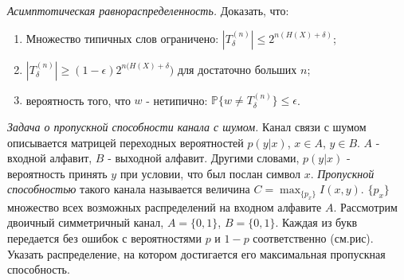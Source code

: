 \begin{problem} \textit{Асимптотическая равнораспределенность.}
Доказать, что:
\begin{enumerate}
\item Множество типичных слов ограничено: $|T_{\delta}^{(n)}| \leq 2^{n(H(X) + \delta)}$;
\item $|T_{\delta}^{(n)}| \geq (1-\epsilon)2^{n(H(X) + \delta})$ для достаточно больших $n$;
\item вероятность того, что $w$ - нетипично: $\mathbb{P}\{w \neq T_{\delta}^{(n)} \} \leq \epsilon$.
\end{enumerate}
\end{problem}
\begin{comment}
\begin{remark} Идея о типичных последовательностях лежит в основе кодирования. Например, $\delta$-типичные $n$-буквенные слова кодируются при помощи двоичных последовательностей длины $n(H(X) + \delta)$, нетипичные отбрасываются или представляются одним и тем же добавочным символом. Очевидно, что при декодировании (восстановлении) вероятность ошибки не превысит $\epsilon$.
\end{remark}

\begin{problem} Рассмотрите связь между доказательством принципа асимптотической равнораспределенности и эквивалентностью (для больших систем)энтропий Больцмана и Гиббса.
\end{problem}
\end{comment}
\begin{problem} \textit{Задача о пропускной способности канала с шумом.} Канал связи с шумом описывается матрицей переходных вероятностей $p(y|x)$, $x \in A$, $y \in B$. $A$ - входной алфавит, $B$ - выходной алфавит. Другими словами, $p(y|x)$ - вероятность принять $y$ при условии, что был послан символ $x$. \textit{Пропускной способностью} такого канала называется величина $C = \max_{\{p_x\}} I(x, y)$. $\{p_x\}$ множество всех возможных распределений на входном алфавите $A$.
Рассмотрим двоичный симметричный канал, $A =\{0, 1\}$, $B =\{0, 1\}$. Каждая из букв передается без ошибок с вероятностями $p$ и $1-p$ соответственно (см.рис). Указать распределение, на котором достигается его максимальная пропускная способность.
\end{problem}
